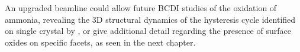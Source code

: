 An upgraded beamline could allow future BCDI studies of the oxidation of ammonia, revealing the 3D structural dynamics of the hysteresis cycle identified on single crystal by \cite{Resta2020a}, or give additional detail regarding the presence of surface oxides on specific facets, as seen in the next chapter.
